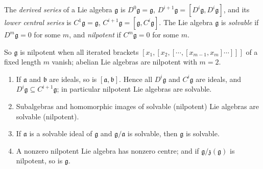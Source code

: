 \begin{definition}\label{representation-theory:definition-solvable}
The \emph{derived series} of a Lie algebra $\mathfrak{g}$ is $D^0\mathfrak{g} = \mathfrak{g}$, $D^{i+1}\mathfrak{g} = [D^i\mathfrak{g}, D^i\mathfrak{g}]$, and its
\emph{lower central series} is $C^1\mathfrak{g} = \mathfrak{g}$, $C^{i+1}\mathfrak{g} = [\mathfrak{g}, C^i\mathfrak{g}]$. The Lie algebra $\mathfrak{g}$ is \emph{solvable}
if $D^m\mathfrak{g} = 0$ for some $m$, and \emph{nilpotent} if $C^m\mathfrak{g} = 0$ for some $m$.
\end{definition}

So $\mathfrak{g}$ is nilpotent when all iterated brackets $[x_1, [x_2, [\cdots, [x_{m-1}, x_m]\cdots]]]$ of a fixed length $m$ vanish; abelian Lie algebras are nilpotent
with $m = 2$.

\begin{lemma}\label{representation-theory:lemma-solvable}
\begin{enumerate}
\item If $\mathfrak{a}$ and $\mathfrak{b}$ are ideals, so is $[\mathfrak{a}, \mathfrak{b}]$. Hence all $D^i\mathfrak{g}$ and $C^i\mathfrak{g}$ are ideals, and
$D^i\mathfrak{g} \subseteq C^{i+1}\mathfrak{g}$; in particular nilpotent Lie algebras are solvable.
\item Subalgebras and homomorphic images of solvable (nilpotent) Lie algebras are solvable (nilpotent).
\item If $\mathfrak{a}$ is a solvable ideal of $\mathfrak{g}$ and $\mathfrak{g}/\mathfrak{a}$ is solvable, then $\mathfrak{g}$ is solvable.
\item A nonzero nilpotent Lie algebra has nonzero centre; and if $\mathfrak{g}/\mathfrak{z}(\mathfrak{g})$ is nilpotent, so is $\mathfrak{g}$.
\end{enumerate}
\end{lemma}


